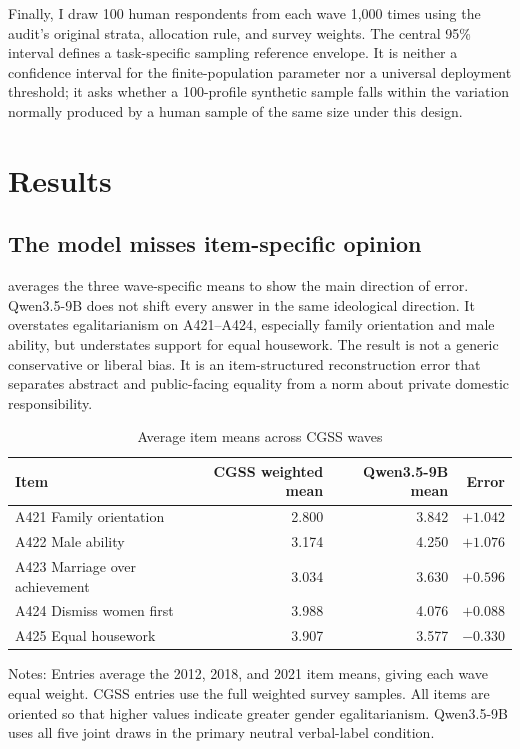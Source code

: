 \documentclass[11pt]{article}
\begin{document}
Finally, I draw 100 human respondents from each wave 1,000 times using the audit's original strata, allocation rule, and survey weights. The central 95\% interval defines a task-specific sampling reference envelope. It is neither a confidence interval for the finite-population parameter nor a universal deployment threshold; it asks whether a 100-profile synthetic sample falls within the variation normally produced by a human sample of the same size under this design.

\section{Results}
\label{sec:results}

\subsection{The model misses item-specific opinion}

 averages the three wave-specific means to show the main direction of error. Qwen3.5-9B does not shift every answer in the same ideological direction. It overstates egalitarianism on A421--A424, especially family orientation and male ability, but understates support for equal housework. The result is not a generic conservative or liberal bias. It is an item-structured reconstruction error that separates abstract and public-facing equality from a norm about private domestic responsibility.

\begin{table}[H]
\centering
\caption{Average item means across CGSS waves}
\label{tab:item-means}
\begin{threeparttable}
\begin{tabular}{lrrr}
\toprule
Item & CGSS weighted mean & Qwen3.5-9B mean & Error \\
\midrule
A421 Family orientation & 2.800 & 3.842 & $+1.042$ \\
A422 Male ability & 3.174 & 4.250 & $+1.076$ \\
A423 Marriage over achievement & 3.034 & 3.630 & $+0.596$ \\
A424 Dismiss women first & 3.988 & 4.076 & $+0.088$ \\
A425 Equal housework & 3.907 & 3.577 & $-0.330$ \\
\bottomrule
\end{tabular}
\begin{tablenotes}[flushleft]
\footnotesize
\item Notes: Entries average the 2012, 2018, and 2021 item means, giving each wave equal weight. CGSS entries use the full weighted survey samples. All items are oriented so that higher values indicate greater gender egalitarianism. Qwen3.5-9B uses all five joint draws in the primary neutral verbal-label condition.
\end{tablenotes}
\end{threeparttable}
\end{table}
\end{document}

